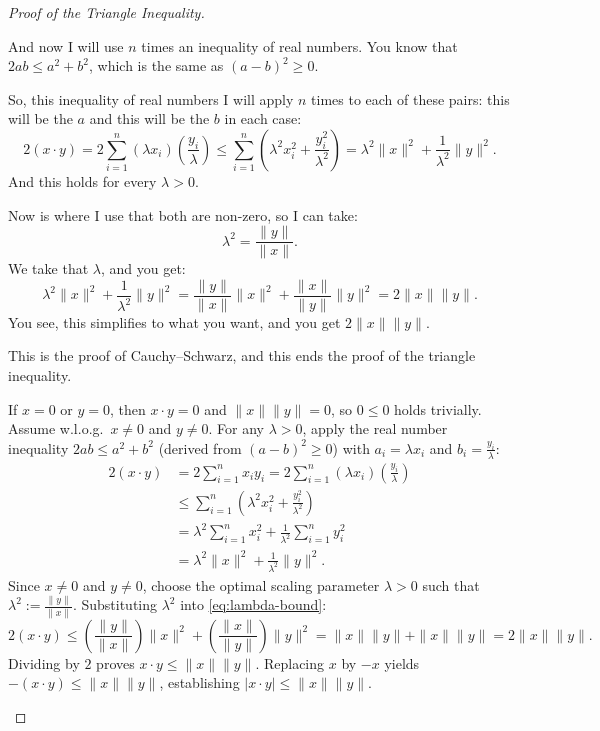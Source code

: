 \begin{proof}[Proof of the Triangle Inequality]
\begin{spoken-clean}[01:04:54 - 01:08:19]
And now I will use $n$ times an inequality of real numbers. You know that $2 a b \le a^2 + b^2$, which is the same as $(a - b)^2 \ge 0$.

So, this inequality of real numbers I will apply $n$ times to each of these pairs: this will be the $a$ and this will be the $b$ in each case:
\[
2 (x \cdot y) = 2 \sum_{i=1}^n (\lambda x_i) \left( \frac{y_i}{\lambda} \right) \le \sum_{i=1}^n \left( \lambda^2 x_i^2 + \frac{y_i^2}{\lambda^2} \right) = \lambda^2 \|x\|^2 + \frac{1}{\lambda^2} \|y\|^2.
\]
And this holds for every $\lambda > 0$.

Now is where I use that both are non-zero, so I can take:
\[
\lambda^2 = \frac{\|y\|}{\|x\|}.
\]
We take that $\lambda$, and you get:
\[
\lambda^2 \|x\|^2 + \frac{1}{\lambda^2} \|y\|^2 = \frac{\|y\|}{\|x\|} \|x\|^2 + \frac{\|x\|}{\|y\|} \|y\|^2 = 2 \|x\| \|y\|.
\]
You see, this simplifies to what you want, and you get $2 \|x\| \|y\|$.

This is the proof of Cauchy--Schwarz, and this ends the proof of the triangle inequality.
\end{spoken-clean}

\begin{math-stroke}
If $x = 0$ or $y = 0$, then $x \cdot y = 0$ and $\|x\| \|y\| = 0$, so $0 \le 0$ holds trivially.
Assume w.l.o.g.\ $x \neq 0$ and $y \neq 0$. For any $\lambda > 0$, apply the real number inequality $2ab \le a^2 + b^2$ (derived from $(a - b)^2 \ge 0$) with $a_i = \lambda x_i$ and $b_i = \frac{y_i}{\lambda}$:
\begin{align}
2 (x \cdot y) &= 2 \sum_{i=1}^n x_i y_i = 2 \sum_{i=1}^n (\lambda x_i) \left( \frac{y_i}{\lambda} \right) \nonumber \\
&\le \sum_{i=1}^n \left( \lambda^2 x_i^2 + \frac{y_i^2}{\lambda^2} \right) \nonumber \\
&= \lambda^2 \sum_{i=1}^n x_i^2 + \frac{1}{\lambda^2} \sum_{i=1}^n y_i^2 \nonumber \\
&= \lambda^2 \|x\|^2 + \frac{1}{\lambda^2} \|y\|^2. \label{eq:lambda-bound}
\end{align}
Since $x \neq 0$ and $y \neq 0$, choose the optimal scaling parameter $\lambda > 0$ such that $\lambda^2 := \frac{\|y\|}{\|x\|}$. Substituting $\lambda^2$ into \eqref{eq:lambda-bound}:
\[
2 (x \cdot y) \le \left( \frac{\|y\|}{\|x\|} \right) \|x\|^2 + \left( \frac{\|x\|}{\|y\|} \right) \|y\|^2 = \|x\| \|y\| + \|x\| \|y\| = 2 \|x\| \|y\|.
\]
Dividing by $2$ proves $x \cdot y \le \|x\| \|y\|$. Replacing $x$ by $-x$ yields $-(x \cdot y) \le \|x\| \|y\|$, establishing $|x \cdot y| \le \|x\| \|y\|$.
\end{math-stroke}


\end{proof}
